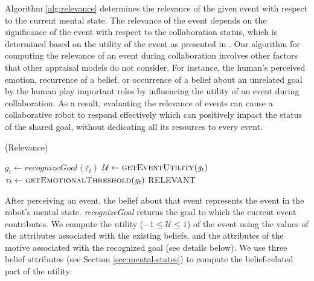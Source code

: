 \documentclass{article}
\begin{document}
Algorithm \ref{alg:relevance} determines the relevance of the given event with
respect to the current mental state. The relevance of the event depends on the
significance of the event with respect to the collaboration status, which is
determined based on the utility of the event as presented in
\cite{gratch:domain-independent,marsella:ema-process-model}. Our algorithm for
computing the relevance of an event during collaboration involves other factors
that other appraisal models do not consider. For instance, the human's
perceived emotion, recurrence of a belief, or occurrence of a belief about an
unrelated goal by the human play important roles by influencing the utility
of an event during collaboration. As a result, evaluating the relevance of
events can cause a collaborative robot to respond effectively which can
positively impact the status of the shared goal, without dedicating all its
resources to every event.

\vspace*{-3mm}
\begin{algorithm}
	\caption{(Relevance)}
	\label{alg:relevance}
	\begin{algorithmic}[1]
			\State $\mathit{g}_{t} \gets \textit{recognizeGoal}{(\varepsilon_t)}$
			\State $\mathcal{U} \gets \Call{getEventUtility}{\mathit{g}_{t}}$ 
			\State $\tau_{t} \gets \Call{getEmotionalThreshold}{\mathit{g}_{t}}$
			 \quad \Return
			{{\fontsize{7}{8}\selectfont RELEVANT}} 
			\Else \quad {}
			\EndIf
		\EndFunction
	\end{algorithmic}
\end{algorithm}

\vspace*{-3mm}
After perceiving an event, the belief about that event represents the event in
the robot's mental state. \textit{recognizeGoal} returns the goal to which the
current event contributes. We compute the utility ($-1 \leq \mathcal{U} \leq 1$)
of the event using the values of the attributes associated with the existing
beliefs, and the attributes of the motive associated with the recognized goal
(see details below). We use three belief attributes (see Section
\ref{sec:mental-states}) to compute the belief-related part of the utility:
\end{document}
